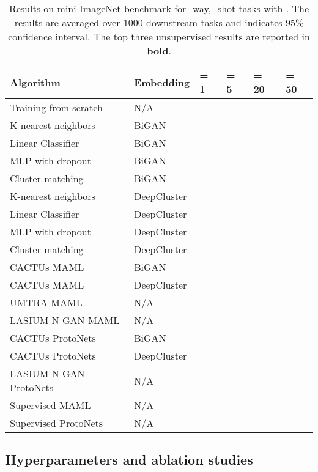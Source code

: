 \documentclass{article}
\begin{document}
\begin{table}[]
    \caption{Results on mini-ImageNet benchmark for -way, -shot tasks with . The results are averaged over 1000 downstream tasks and  indicates 95\% confidence interval. The top three unsupervised results are reported in {\bf bold}.}
    \label{tab:mini-imagenet}
    \centering
    {\footnotesize
\begin{tabular}{p{2.7cm}p{1.5cm}p{1.8cm}p{1.8cm}p{1.8cm}p{1.8cm}}
            \toprule
            Algorithm & Embedding &  = 1 &  = 5 &  = 20 &  = 50 \\
            \midrule
            Training from scratch & N/A &  &  &  & \\
            K-nearest neighbors & BiGAN &  &  &  & \\
            Linear Classifier & BiGAN &  &  &  &  \\
            MLP with dropout & BiGAN &  &  &  &  \\
            Cluster matching & BiGAN &  &  &  & \\
            K-nearest neighbors & DeepCluster &  &  &  & \\
            Linear Classifier & DeepCluster &  &  &  & \\
            MLP with dropout & DeepCluster &  &  &  & \\
            Cluster matching & DeepCluster &  &  &  & \\
            \midrule
            CACTUs MAML & BiGAN &  &  &  &  \\
            CACTUs MAML & DeepCluster &  &  &  &  \\
            UMTRA MAML & N/A &  &  &  &  \\
            LASIUM-N-GAN-MAML & N/A &  &  &  &  \\
\midrule
            CACTUs ProtoNets & BiGAN &  &  &  &  \\
            CACTUs ProtoNets & DeepCluster &  &  &  &  \\
            LASIUM-N-GAN-ProtoNets & N/A &  &  &  &  \\
\midrule
Supervised MAML & N/A &  &  &  & \\
            Supervised ProtoNets & N/A &  &  &  & \\
            
            \bottomrule
        \end{tabular}
    }
\end{table}


\subsection{Hyperparameters and ablation studies}
\label{ablation_studies}
\end{document}
